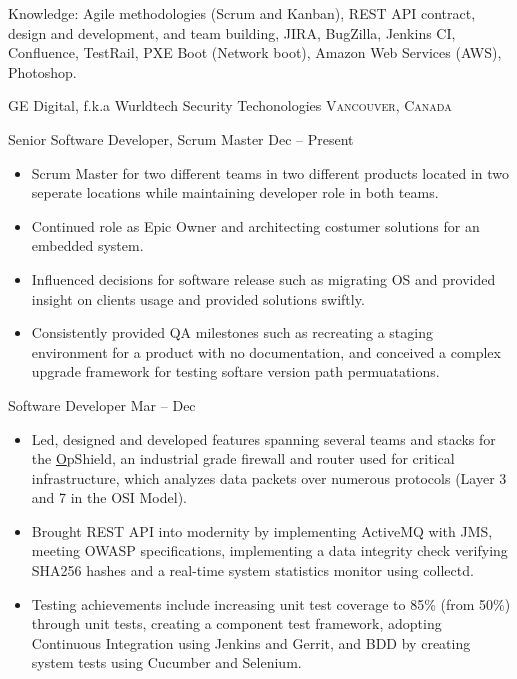 \documentclass[10pt,a4paper]{article}
\begin{document}
\inlineheadsection 
  {Knowledge:}
  {Agile methodologies (Scrum and Kanban), REST API contract, design and development, and team building, JIRA, BugZilla, Jenkins CI, Confluence, TestRail, PXE Boot (Network boot), Amazon Web Services (AWS), Photoshop.}

\vspace{2em}
\spacedhrule{0em}{-0.4em}


\headedsection  %
  {{GE Digital, f.k.a Wurldtech Security Techonologies}}
  {\textsc{Vancouver, Canada}} {%
  \headedsubsection
    {Senior Software Developer, Scrum Master}
    {Dec  -- Present}
   {\noindent\begin{itemize}  \item Scrum Master for two different teams in two different products located in two seperate locations while maintaining developer role in both teams.
\item Continued role as Epic Owner and architecting costumer solutions for an embedded system.
\item Influenced decisions for software release such as migrating OS and provided insight on clients usage and provided solutions swiftly.
\item Consistently provided QA milestones such as recreating a staging environment for a product with no documentation, and conceived a complex upgrade framework for testing softare version path permuatations. 
\end{itemize}}
    
  \headedsubsection
    {Software Developer}
    {Mar  -- Dec }
    {\noindent\begin{itemize}  \item Led, designed and developed features spanning several teams and stacks for the \href{https://www.ge.com/digital/asset/opshield-ge-digital}OpShield, an industrial
grade firewall and router used for critical infrastructure, which analyzes data packets over numerous protocols (Layer
3 and 7 in the OSI Model).
\item Brought REST API into modernity by implementing ActiveMQ
with JMS, meeting OWASP specifications, implementing a data integrity check verifying SHA256 hashes and a real-time system statistics monitor using collectd.
\item Testing achievements include increasing unit test coverage to 85\% (from 50\%) through unit tests, creating a component test framework, adopting Continuous Integration using Jenkins and Gerrit, and BDD by creating system tests using Cucumber and Selenium.
\end{itemize}}
}
\end{document}
